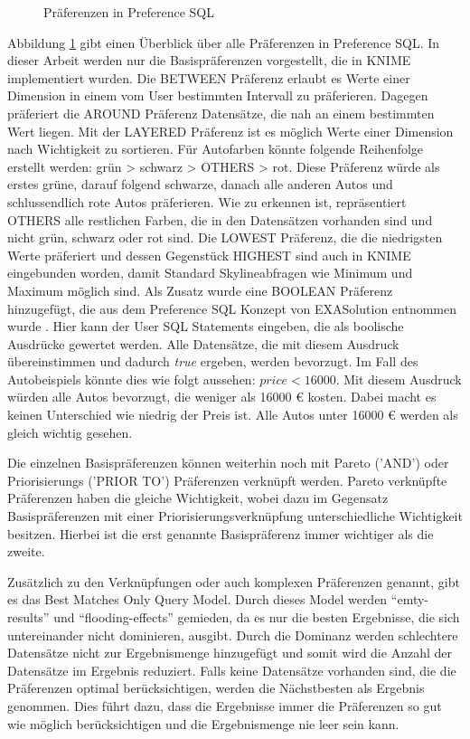 {\begin{figure}[H]
\begin{tikzpicture}
\end{tikzpicture}
	\caption{Präferenzen in Preference SQL}
	\label{img:preferences}
\end{figure} 

Abbildung \ref{img:preferences} gibt einen Überblick über alle Präferenzen in Preference SQL. In dieser Arbeit werden nur die Basispräferenzen vorgestellt, die in KNIME implementiert wurden. Die BETWEEN Präferenz erlaubt es Werte einer Dimension in einem vom User bestimmten Intervall zu präferieren. Dagegen präferiert die AROUND Präferenz Datensätze, die nah an einem bestimmten Wert liegen. Mit der LAYERED Präferenz ist es möglich Werte einer Dimension nach Wichtigkeit zu sortieren. Für Autofarben könnte folgende Reihenfolge erstellt werden: grün > schwarz > OTHERS > rot. Diese Präferenz würde als erstes grüne, darauf folgend schwarze, danach alle anderen Autos und schlussendlich rote Autos präferieren. Wie zu erkennen ist, repräsentiert OTHERS alle restlichen Farben, die in den Datensätzen vorhanden sind und nicht grün, schwarz oder rot sind.
Die LOWEST Präferenz, die die niedrigsten Werte präferiert und dessen Gegenstück HIGHEST sind auch in KNIME eingebunden worden, damit Standard Skylineabfragen wie Minimum und Maximum möglich sind.
Als Zusatz wurde eine BOOLEAN Präferenz hinzugefügt, die aus dem Preference SQL Konzept von EXASolution entnommen wurde \cite{EXASolution}. Hier kann der User SQL Statements eingeben, die als boolische Ausdrücke gewertet werden. Alle Datensätze, die mit diesem Ausdruck übereinstimmen und dadurch \textit{true} ergeben, werden bevorzugt. Im Fall des Autobeispiels könnte dies wie folgt aussehen: $price < 16000$. Mit diesem Ausdruck würden alle Autos bevorzugt, die weniger als 16000 \euro{} kosten. Dabei macht es keinen Unterschied wie niedrig der Preis ist. Alle Autos unter 16000 \euro{} werden als gleich wichtig gesehen. 

Die einzelnen Basispräferenzen können weiterhin noch mit Pareto ('AND') oder Priorisierungs ('PRIOR TO') Präferenzen verknüpft werden. Pareto verknüpfte Präferenzen haben die gleiche Wichtigkeit, wobei dazu im Gegensatz Basispräferenzen mit einer Priorisierungsverknüpfung unterschiedliche Wichtigkeit besitzen. Hierbei ist die erst genannte Basispräferenz immer wichtiger als die zweite.  

Zusätzlich zu den Verknüpfungen oder auch komplexen Präferenzen genannt, gibt es das Best Matches Only Query Model. Durch dieses Model werden \enquote{emty-results} und \enquote{flooding-effects} gemieden, da es nur die besten Ergebnisse, die sich untereinander nicht dominieren, ausgibt. Durch die Dominanz werden schlechtere Datensätze nicht zur Ergebnismenge hinzugefügt und somit wird die Anzahl der Datensätze im Ergebnis reduziert. Falls keine Datensätze vorhanden sind, die die Präferenzen optimal berücksichtigen, werden die Nächstbesten als Ergebnis genommen. Dies führt dazu, dass die Ergebnisse immer die Präferenzen so gut wie möglich berücksichtigen und die Ergebnismenge nie leer sein kann.

}
